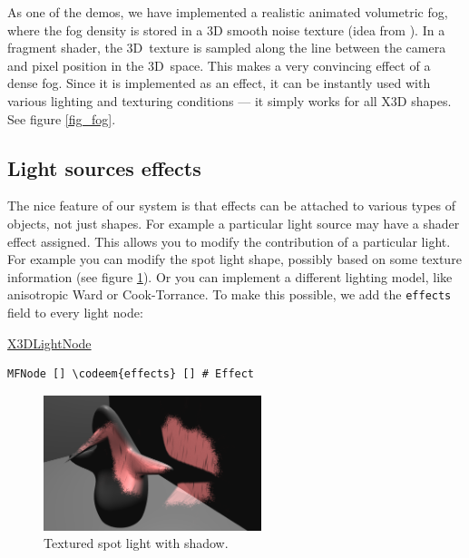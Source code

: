 \documentclass{egpubl}
\newenvironment{mycode}
{\begin{mycodecore}}
{\end{mycodecore}
\vspace{-0.1in}}
\newcommand*{\codeem}[1]{\textbf{#1}}
\begin{document}
As one of the demos, we have implemented a realistic
animated volumetric fog, where the fog density is stored in
a 3D smooth noise texture (idea from \cite{humus:volumetricfog}).
In a fragment shader, the 3D~texture is sampled
along the line between the camera and pixel position in the 3D~space. This makes a very
convincing effect of a dense fog. Since it is implemented as an effect,
it can be instantly used with various lighting and texturing conditions
--- it simply works for all X3D shapes. See figure \ref{fig_fog}.

\subsection{Light sources effects}

The nice feature of our system is that effects can be attached to various
types of objects, not just shapes. For example a particular light source
may have a shader effect assigned.
This allows you to modify the contribution of a particular light.
For example you can modify the spot light shape, possibly
based on some texture information (see figure \ref{fig_fancy_spot}).
Or you can implement a different lighting model, like anisotropic Ward
or Cook-Torrance.
To make this possible, we add the \texttt{effects} field to every light node:

\begin{mycode}
\underline{X3DLightNode}
\begin{Verbatim}[commandchars=\\\{\},fontsize=\small]
MFNode [] \codeem{effects} [] # Effect
\end{Verbatim}
\end{mycode}

\begin{figure}[H]
  \centering
  \includegraphics[width=2.5in]{fancy_light_spot_shape-cropped}
  \caption{Textured spot light with shadow.}
  \label{fig_fancy_spot}
\end{figure}

\end{document}

